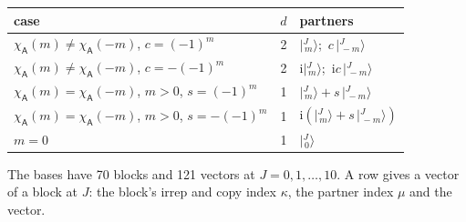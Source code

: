 \documentclass[10pt,a4paper]{article}
\numberwithin{equation}{section}
\newcommand{\grp}[1]{\mathsf{#1}}
\newcommand{\iunit}{\mathrm{i}}
\newcommand{\chiA}{\chi_{\grp{A}}}
\newcommand{\mult}{\kappa}
\newcommand{\intx}{\mu}
\newcommand{\jm}[2]{\bigl\lvert{}^{#1}_{\,#2}\bigr\rangle}
\begin{document}
\begin{center}\begin{tabular}{@{}lrl@{}}\toprule
case & $d$ & partners\\\midrule
$\chiA(m) \ne \chiA(-m)$, $c = (-1)^m$ & 2 & $\jm{J}{m}$;\ $c\,\jm{J}{-m}$\\
$\chiA(m) \ne \chiA(-m)$, $c = -(-1)^m$ & 2 & $\iunit\jm{J}{m}$;\ $\iunit c\,\jm{J}{-m}$\\
$\chiA(m) = \chiA(-m)$, $m > 0$, $s = (-1)^m$ & 1 & $\jm{J}{m} + s\,\jm{J}{-m}$\\
$\chiA(m) = \chiA(-m)$, $m > 0$, $s = -(-1)^m$ & 1 & $\iunit(\jm{J}{m} + s\,\jm{J}{-m})$\\
$m = 0$ & 1 & $\jm{J}{0}$\\
\bottomrule\end{tabular}\end{center}
The bases have 70 blocks and 121 vectors at $J = 0, 1, \dots, 10$. \label{n:head.vector}A row gives a vector of a block at $J$: the block's irrep and copy index $\mult$, the partner index $\intx$ and the vector.
\end{document}
